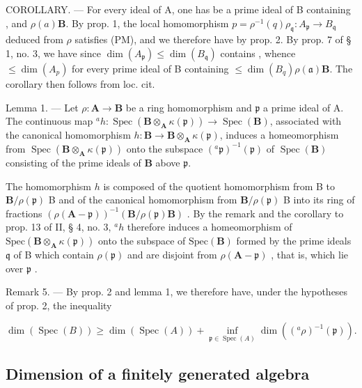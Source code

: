 COROLLARY. --- For every ideal  of A, one has 
 be a prime ideal of B containing 
, and \(\rho(a)\mathbf{B}\). By prop. 1, the local homomorphism \(p = \rho^{-1}(q)\)\(\rho_{\mathfrak{q}}: A_{\mathfrak{p}} \to B_{\mathfrak{q}}\) deduced from \(\rho\) satisfies (PM), and we therefore have  by prop. 2. By prop. 7 of § 1, no. 3, we have  since \(\dim(A_{\mathfrak{p}}) \leqslant \dim(B_{\mathfrak{q}})\) contains , whence \(\leqslant \dim(A_p)\) for every prime ideal  of B containing \(\leqslant \dim(B_q)\)\(\rho(\mathfrak{a})\mathbf{B}\). The corollary then follows from loc. cit.

Lemma 1. — Let \(\rho: \mathbf{A} \to \mathbf{B}\) be a ring homomorphism and \(\mathfrak{p}\) a prime ideal of A. The continuous map \(^{a}h: \operatorname{Spec}(\mathbf{B} \otimes_{\mathbf{A}} \kappa(\mathfrak{p})) \to \operatorname{Spec}(\mathbf{B})\), associated with the canonical homomorphism \(h:\mathbf{B}\to\mathbf{B}\otimes_{\mathbf{A}}\kappa(\mathfrak{p})\), induces a homeomorphism from \(\operatorname{Spec}(\mathbf{B}\otimes_{\mathbf{A}}\kappa(\mathfrak{p}))\) onto the subspace \((^{a}\mathfrak{p})^{-1}(\mathfrak{p})\) of \(\operatorname{Spec}(\mathbf{B})\) consisting of the prime ideals of \(\mathbf{B}\) above \(\mathfrak{p}\).

The homomorphism \(h\) is composed of the quotient homomorphism from B to \(\mathbf{B} / \rho(\mathfrak{p})\) B and of the canonical homomorphism from \(\mathbf{B} / \rho(\mathfrak{p})\) B into its ring of fractions \((\rho(\mathbf{A} - \mathfrak{p}))^{-1}(\mathbf{B} / \rho(\mathfrak{p}) \mathbf{B})\) . By the remark and the corollary to prop. 13 of II, § 4, no. 3, \(^a h\) therefore induces a homeomorphism of \(\text{Spec}(\mathbf{B} \otimes_{\mathbf{A}} \kappa(\mathfrak{p}))\) onto the subspace of \(\text{Spec}(\mathbf{B})\) formed by the prime ideals \(\mathfrak{q}\) of B which contain \(\rho(\mathfrak{p})\) and are disjoint from \(\rho(\mathbf{A} - \mathfrak{p})\) , that is, which lie over \(\mathfrak{p}\) .

Remark 5. --- By prop. 2 and lemma 1, we therefore have, under the hypotheses of prop. 2, the inequality

\[
\dim (\operatorname{Spec} (B)) \geqslant \dim (\operatorname{Spec} (A)) + \inf _ {\mathfrak {p} \in \operatorname{Spec} (A)} \dim \left(({}^{a}\rho)^{-1} (\mathfrak {p})\right).\tag{4}
\]

\subsection{Dimension of a finitely generated algebra}


